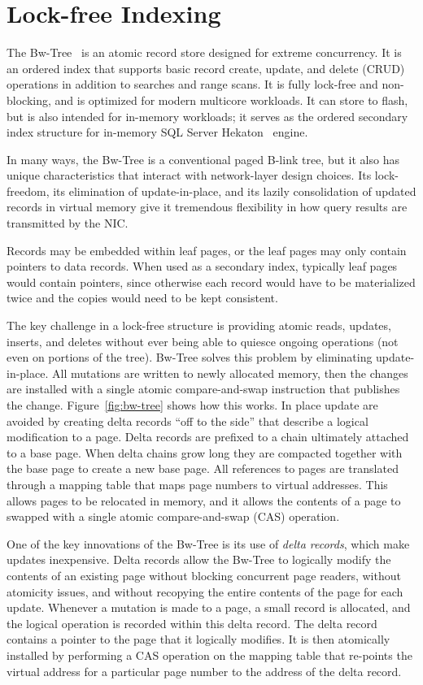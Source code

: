 \section{Lock-free Indexing}
\label{sec:bwtree-intro}
The Bw-Tree~\cite{bw-tree} is an atomic record store designed for extreme
concurrency. It is an ordered index that supports basic record create, update,
and delete (CRUD) operations in addition to searches and range scans.  It is
fully lock-free and non-blocking, and is optimized for modern multicore
workloads. It can store to flash, but is also intended for in-memory
workloads; it serves as the ordered secondary index structure for in-memory SQL
Server Hekaton~\cite{hekaton} engine.

In many ways, the Bw-Tree is a conventional paged B-link tree,
but it also has unique characteristics that interact with network-layer
design choices. Its lock-freedom, its elimination of update-in-place,
and its lazily consolidation of updated records in virtual memory give it
tremendous flexibility in how query results are transmitted by the NIC.

Records may be embedded within leaf pages, or the leaf pages may
only contain pointers to data records. When used as a secondary index,
typically leaf pages would contain pointers, since otherwise each record would
have to be materialized twice and the copies would need to be kept consistent.

The key challenge in a lock-free structure is providing atomic reads, updates,
inserts, and deletes without ever being able to quiesce ongoing operations (not
even on portions of the tree). Bw-Tree solves this problem by eliminating
update-in-place. All mutations are written to newly allocated memory, then
the changes are installed with a single atomic compare-and-swap instruction
that publishes the change.  Figure~\ref{fig:bw-tree} shows how this works.
In place update are avoided by creating delta records ``off to the side'' 
that describe a logical modification to a page. Delta records are
prefixed to a chain ultimately attached to a base page.  When delta chains
grow long they are compacted together with the base page to create a new base page.
All references to pages are translated through a mapping table that maps page
numbers to virtual addresses. This allows pages to be relocated in memory, and
it allows the contents of a page to swapped with a single atomic
compare-and-swap (CAS) operation.


One of the key innovations of the Bw-Tree is its use of {\em delta records},
which make updates inexpensive.
Delta records allow the Bw-Tree to logically modify the
contents of an existing page without blocking concurrent page readers, without
atomicity issues, and without recopying the entire contents of the page for
each update.  Whenever a mutation is made to a page, a small record is
allocated, and the logical operation is recorded within this delta record. The delta
record contains a pointer to the page that it logically modifies. It
is then atomically installed by performing a CAS operation on the
mapping table that re-points the virtual address for a particular page number
to the address of the delta record.

